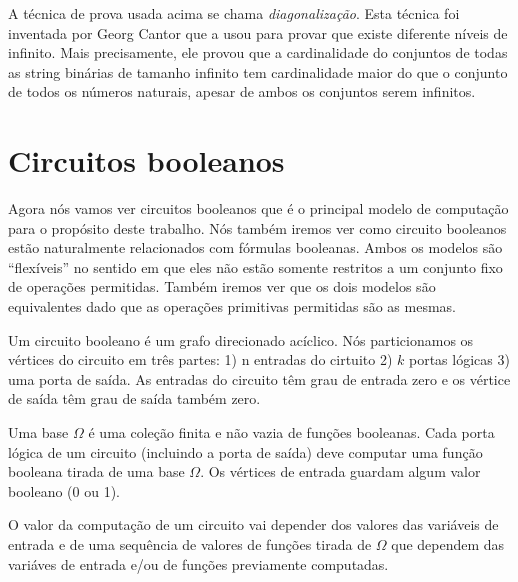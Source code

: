 A técnica de prova usada acima se chama \emph{diagonalização}. Esta técnica foi inventada por Georg Cantor que a usou para provar que existe diferente níveis de infinito. Mais precisamente, ele provou que a cardinalidade do conjuntos de todas as string binárias de tamanho infinito tem cardinalidade maior do que o conjunto de todos os números naturais, apesar de ambos os conjuntos serem infinitos.

\section{Circuitos booleanos} \label{section_boolean_circuits}

Agora nós vamos ver circuitos booleanos que é o principal modelo de computação para o propósito deste trabalho. Nós também iremos ver como circuito booleanos estão naturalmente relacionados com fórmulas booleanas. Ambos os modelos são ``flexíveis'' no sentido em que eles não estão somente restritos a um conjunto fixo de operações permitidas. Também iremos ver que os dois modelos são equivalentes dado que as operações primitivas permitidas são as mesmas.

Um circuito booleano é um grafo direcionado acíclico. Nós particionamos os vértices do circuito em três partes: 1) n entradas do cirtuito 2) $k$ portas lógicas 3) uma porta de saída. As entradas do circuito têm grau de entrada zero e os vértice de saída têm grau de saída também zero.

Uma base $\Omega$ é uma coleção finita e não vazia de funções booleanas. Cada porta lógica de um circuito (incluindo a porta de saída) deve computar uma função booleana tirada de uma base $\Omega$. Os vértices de entrada guardam algum valor booleano (0 ou 1).

O valor da computação de um circuito vai depender dos valores das variáveis de entrada e de uma sequência de valores de funções tirada de $\Omega$ que dependem das variáves de entrada e/ou de funções previamente computadas.

